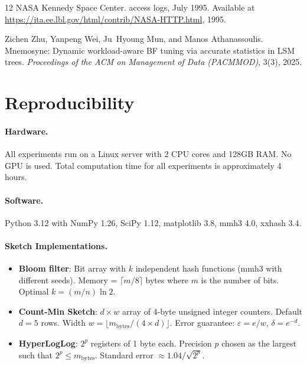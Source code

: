 \documentclass[preprint]{article}
\begin{document}
\begin{thebibliography}{12}
{NASA Kennedy Space Center}.
 access logs, {July} 1995.
\newblock Available at \url{https://ita.ee.lbl.gov/html/contrib/NASA-HTTP.html}, 1995.

Zichen Zhu, Yanpeng Wei, Ju~Hyoung Mun, and Manos Athanassoulis.
\newblock Mnemosyne: Dynamic workload-aware {BF} tuning via accurate statistics in {LSM} trees.
\newblock \emph{Proceedings of the ACM on Management of Data (PACMMOD)}, 3(3), 2025.

\end{thebibliography}

\appendix
\section{Reproducibility}
\label{app:reproducibility}

\paragraph{Hardware.}
All experiments run on a Linux server with 2 CPU cores and 128GB RAM. No GPU is used. Total computation time for all experiments is approximately 4 hours.

\paragraph{Software.}
Python 3.12 with NumPy 1.26, SciPy 1.12, matplotlib 3.8, mmh3 4.0, xxhash 3.4.

\paragraph{Sketch Implementations.}
\begin{itemize}
    \item \textbf{Bloom filter}: Bit array with $k$ independent hash functions (mmh3 with different seeds). Memory = $\lceil m/8 \rceil$ bytes where $m$ is the number of bits. Optimal $k = (m/n) \ln 2$.
    \item \textbf{Count-Min Sketch}: $d \times w$ array of 4-byte unsigned integer counters. Default $d=5$ rows. Width $w = \lfloor m_\text{bytes} / (4 \times d) \rfloor$. Error guarantee: $\varepsilon = e/w$, $\delta = e^{-d}$.
    \item \textbf{HyperLogLog}: $2^p$ registers of 1 byte each. Precision $p$ chosen as the largest such that $2^p \leq m_\text{bytes}$. Standard error $\approx 1.04/\sqrt{2^p}$.
\end{itemize}
\end{document}
